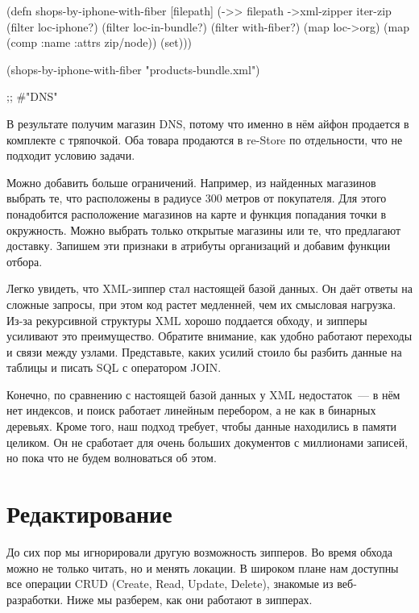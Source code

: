 \begin{english}
  \begin{clojure}
(defn shops-by-iphone-with-fiber [filepath]
  (->> filepath
       ->xml-zipper
       iter-zip
       (filter loc-iphone?)
       (filter loc-in-bundle?)
       (filter with-fiber?)
       (map loc->org)
       (map (comp :name :attrs zip/node))
       (set)))

(shops-by-iphone-with-fiber "products-bundle.xml")

;; #{"DNS"}
  \end{clojure}
\end{english}

В результате получим магазин DNS, потому что именно в нём айфон продается в
комплекте с тряпочкой. Оба товара продаются в re-Store по отдельности, что не
подходит условию задачи.

Можно добавить больше ограничений. Например, из найденных магазинов выбрать те,
что расположены в радиусе 300 метров от покупателя. Для этого понадобится
расположение магазинов на карте и функция попадания точки в окружность. Можно
выбрать только открытые магазины или те, что предлагают доставку. Запишем эти
признаки в атрибуты организаций и добавим функции отбора.

Легко увидеть, что XML-зиппер стал настоящей базой данных. Он даёт ответы на
сложные запросы, при этом код растет медленней, чем их смысловая нагрузка. Из-за
рекурсивной структуры XML хорошо поддается обходу, и зипперы усиливают это
преимущество. Обратите внимание, как удобно работают переходы и связи между
узлами. Представьте, каких усилий стоило бы разбить данные на таблицы и писать
SQL с оператором JOIN.

Конечно, по сравнению с настоящей базой данных у XML недостаток~--- в нём нет
индексов, и поиск работает линейным перебором, а не как в бинарных
деревьях. Кроме того, наш подход требует, чтобы данные находились в памяти
целиком. Он не сработает для очень больших документов с миллионами записей, но
пока что не будем волноваться об этом.

\section{Редактирование}

До сих пор мы игнорировали другую возможность зипперов. Во время обхода можно не
только читать, но и менять локации. В широком плане нам доступны все операции
CRUD (Create, Read, Update, Delete), знакомые из веб-разработки. Ниже мы
разберем, как они работают в зипперах.

